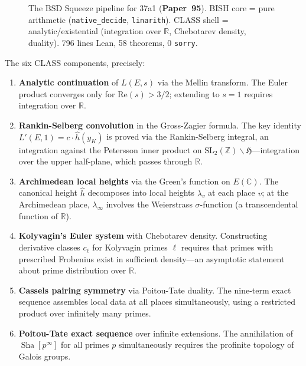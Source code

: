 \documentclass[11pt,twoside,openany]{report}
\theoremstyle{remark}
\newcommand{\BISH}{\textsf{BISH}}
\newcommand{\CLASS}{\textsf{CLASS}}
\newcommand{\paperref}[1]{\textbf{Paper~#1}}
\DeclareMathOperator{\Sha}{Sha}
\begin{document}
\begin{figure}[htbp]
\caption{The BSD Squeeze pipeline for 37a1 (\paperref{95}). \BISH{} core = pure arithmetic (\texttt{native\_decide}, \texttt{linarith}). \CLASS{} shell = analytic/existential (integration over $\mathbb{R}$, Chebotarev density, duality). 796 lines Lean, 58 theorems, 0 \texttt{sorry}.}
\label{fig:bsd-pipeline}
\end{figure}

The six \CLASS{} components, precisely:
\begin{enumerate}[label=\textbf{C\arabic*:}, leftmargin=2cm]
  \item \textbf{Analytic continuation} of $L(E,s)$ via the Mellin transform. The Euler product converges only for $\mathrm{Re}(s) > 3/2$; extending to $s = 1$ requires integration over $\mathbb{R}$.
  \item \textbf{Rankin-Selberg convolution} in the Gross-Zagier formula. The key identity $L'(E,1) = c \cdot \hat{h}(y_K)$ is proved via the Rankin-Selberg integral, an integration against the Petersson inner product on $\mathrm{SL}_2(\mathbb{Z}) \backslash \mathfrak{H}$---integration over the upper half-plane, which passes through $\mathbb{R}$.
  \item \textbf{Archimedean local heights} via the Green's function on $E(\mathbb{C})$. The canonical height $\hat{h}$ decomposes into local heights $\lambda_v$ at each place $v$; at the Archimedean place, $\lambda_\infty$ involves the Weierstrass $\sigma$-function (a transcendental function of $\mathbb{R}$).
  \item \textbf{Kolyvagin's Euler system} with Chebotarev density. Constructing derivative classes $c_\ell$ for Kolyvagin primes $\ell$ requires that primes with prescribed Frobenius exist in sufficient density---an asymptotic statement about prime distribution over $\mathbb{R}$.
  \item \textbf{Cassels pairing symmetry} via Poitou-Tate duality. The nine-term exact sequence assembles local data at all places simultaneously, using a restricted product over infinitely many primes.
  \item \textbf{Poitou-Tate exact sequence} over infinite extensions. The annihilation of $\Sha[p^\infty]$ for all primes $p$ simultaneously requires the profinite topology of Galois groups.
\end{enumerate}
\end{document}
